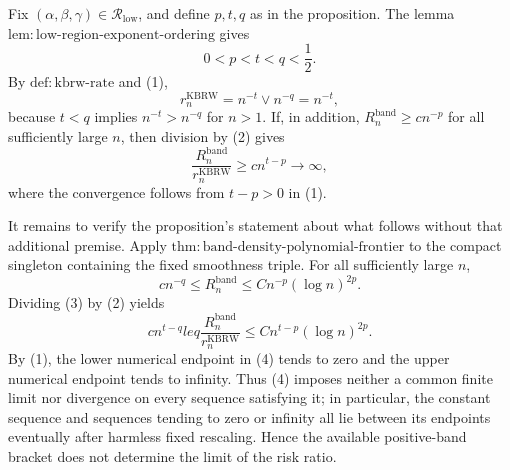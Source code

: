 Fix \((\alpha,\beta,\gamma)\in\mathcal R_{\mathrm{low}}\), and define
\(p,t,q\) as in the proposition.  The lemma
\(\mathrm{lem:low\mbox{-}region\mbox{-}exponent\mbox{-}ordering}\) gives
\[
0<p<t<q<\frac12.
\tag{1}
\]
By \(\mathrm{def:kbrw\mbox{-}rate}\) and (1),
\[
r_n^{\mathrm{KBRW}}
=n^{-t}\vee n^{-q}
=n^{-t},
\tag{2}
\]
because \(t<q\) implies \(n^{-t}>n^{-q}\) for \(n>1\).  If, in addition,
\(R_n^{\mathrm{band}}\geq c n^{-p}\) for all sufficiently large \(n\),
then division by (2) gives
\[
\frac{R_n^{\mathrm{band}}}{r_n^{\mathrm{KBRW}}}
\geq c n^{t-p}\longrightarrow\infty,
\]
where the convergence follows from \(t-p>0\) in (1).

It remains to verify the proposition's statement about what follows without
that additional premise.  Apply
\(\mathrm{thm:band\mbox{-}density\mbox{-}polynomial\mbox{-}frontier}\) to
the compact singleton containing the fixed smoothness triple.  For all
sufficiently large \(n\),
\[
c n^{-q}\leq R_n^{\mathrm{band}}
\leq Cn^{-p}(\log n)^{2p}.
\tag{3}
\]
Dividing (3) by (2) yields
\[
c n^{t-q}leq
\frac{R_n^{\mathrm{band}}}{r_n^{\mathrm{KBRW}}}
\leq Cn^{t-p}(\log n)^{2p}.
\tag{4}
\]
By (1), the lower numerical endpoint in (4) tends to zero and the upper
numerical endpoint tends to infinity.  Thus (4) imposes neither a common
finite limit nor divergence on every sequence satisfying it; in particular,
the constant sequence and sequences tending to zero or infinity all lie
between its endpoints eventually after harmless fixed rescaling.  Hence the
available positive-band bracket does not determine the limit of the risk
ratio.